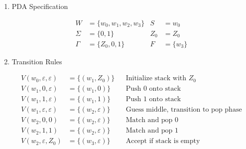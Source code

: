\documentclass[12pt,a4paper,openany]{article}
\begin{document}
\begin{enumerate}

\item PDA Specification

\begin{align*}
W &= \{w_0, w_1, w_2, w_3\} & S &= w_0 \\
\Sigma &= \{0, 1\} & Z_0 &= Z_0 \\
\Gamma &= \{Z_0, 0, 1\} & F &= \{w_3\} 
\end{align*}

\item Transition Rules

\begin{align*}
V(w_0, \varepsilon, \varepsilon) &= \{(w_1, Z_0)\} && \text{Initialize stack with $Z_0$} \\
V(w_1, 0, \varepsilon) &= \{(w_1, 0)\} && \text{Push 0 onto stack} \\
V(w_1, 1, \varepsilon) &= \{(w_1, 1)\} && \text{Push 1 onto stack} \\
V(w_1, \varepsilon, \varepsilon) &= \{(w_2, \varepsilon)\} && \text{Guess middle, transition to pop phase} \\
V(w_2, 0, 0) &= \{(w_2, \varepsilon)\} && \text{Match and pop 0} \\
V(w_2, 1, 1) &= \{(w_2, \varepsilon)\} && \text{Match and pop 1} \\
V(w_2, \varepsilon, Z_0) &= \{(w_3, \varepsilon)\} && \text{Accept if stack is empty}
\end{align*}\\

\begin{center}
\end{center}


\end{enumerate}
\end{document}
